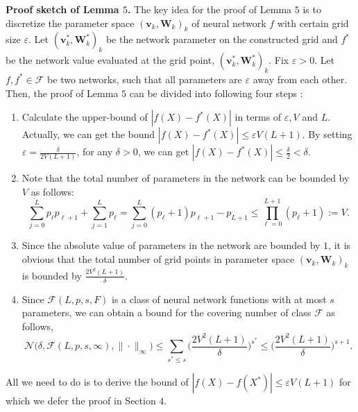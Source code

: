 \documentclass{article}
\theoremstyle{definition}
\begin{document}
\noindent\textbf{Proof sketch of Lemma $5$.} 
The key idea for the proof of Lemma $5$ is to discretize the parameter space $(\textbf{v}_{k},\textbf{W}_{k})_{k}$ of neural network $f$ with certain grid size $\varepsilon$. 
Let $(\textbf{v}_{k}^{*},\textbf{W}_{k}^{*})_{k}$ be the network parameter on the constructed grid and $f^*$ be the network value evaluated at the grid point,  $(\textbf{v}_{k}^{*},\textbf{W}_{k}^{*})_{k}$.
Fix $\varepsilon>0$.
Let $f,f^*\in\mathcal{F}$ be two networks, such that all parameters are $\varepsilon$ away from each other.
Then, the proof of Lemma $5$ can be divided into following four steps :
\begin{enumerate}
    \item Calculate the upper-bound of $|f(X)-f^*(X)|$ in terms of $\varepsilon,V$ and $L$. Actually, we can get the bound $|f(X)-f^*(X)|\leq \varepsilon V(L+1)$. By setting $\varepsilon=\frac{\delta}{2V(L+1)}$, for any $\delta>0$, we can get $|f(X)-f^*(X)|\leq \frac{\delta}{2}<\delta$. 
    
    \item Note that the total number of parameters in the network can be bounded by $V$ as follows:
    \begin{equation*}
        \sum_{j=0}^{L}p_{\ell}p_{\ell+1}+\sum_{j=1}^{L}p_{\ell}
        = \sum_{j=0}^{L}(p_{\ell}+1)p_{\ell+1}-p_{L+1}
        \leq \prod_{\ell=0}^{L+1}(p_{\ell}+1) := V.
    \end{equation*}
    
    \item Since the absolute value of parameters in the network are bounded by $1$, it is obvious that the total number of grid points in parameter space $(\textbf{v}_{k},\textbf{W}_{k})_{k}$ is bounded by $\frac{2V^{2}(L+1)}{\delta}$.
    
    \item Since $\mathcal{F}(L,p,s,F)$ is a class of neural network functions with at most $s$ parameters, we can obtain a bound for the covering number of class $\mathcal{F}$ as follows,
    \begin{equation*}
        \mathcal{N}\bigg(\delta,\mathcal{F}(L,p,s,\infty),\|\cdot\|_{\infty}\bigg)
        \leq \sum_{s^*\leq s}\bigg(\frac{2V^{2}(L+1)}{\delta}\bigg)^{s^*}
        \leq \bigg(\frac{2V^{2}(L+1)}{\delta}\bigg)^{s+1}.
    \end{equation*}
\end{enumerate}

\noindent
All we need to do is to derive the bound of $|f(X)-f(X^*)|\leq \varepsilon V(L+1)$ for which we defer the proof in Section $4$.
\end{document}
